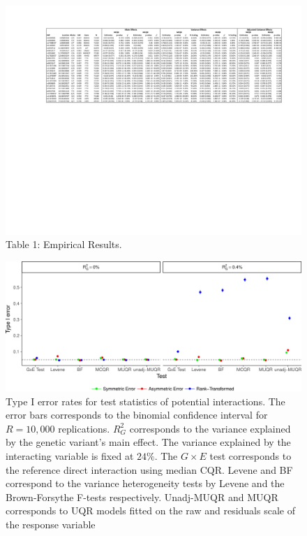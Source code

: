 \documentclass[12pt]{article}
\begin{document}
\newpage
\begin{landscape}
	\centering
	\begin{figure} 
		\centering
		\includegraphics[width=1 \textwidth, height=0.55\textwidth]{figures/Table_1.pdf}
		\caption{Table 1: Empirical Results.}
		\label{fig:Table_1_EmpiricalResults}
	\end{figure}
\end{landscape}

\newpage
\begin{landscape}
	\centering
	\begin{figure}[h!]
		\centering
		\includegraphics[width=1 \textwidth, height=0.55\textwidth]{figures/FP_R004_2.jpg}
		\caption{Type I error rates for test statistics of potential interactions. The error bars corresponds to the binomial confidence interval for $R=10,000$ replications. $R^{2}_G$ corresponds to the variance explained by the genetic variant's main effect. The variance explained by the interacting variable is fixed at $24\%$. The $G\times E$ test corresponds to the reference direct interaction using median CQR. Levene and BF correspond to the variance heterogeneity tests by Levene and the Brown-Forsythe F-tests respectively. Unadj-MUQR and MUQR corresponds to UQR models fitted on the raw and residuals scale of the response variable}
		\label{fig:FP}
	\end{figure}
\end{landscape}
\end{document}
